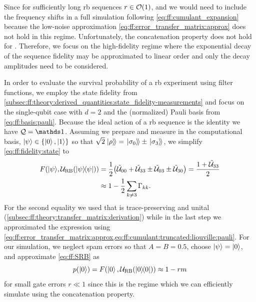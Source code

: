 Since for sufficiently long \gls{rb} sequences $r\in\order{1}$, and we would need to include the frequency shifts \freqshifts in a full simulation following \cref{eq:ff:cumulant_expansion} because the low-noise approximation \cref{eq:ff:error_transfer_matrix:approx} does not hold in this regime.
Unfortunately, the concatenation property does not hold for \freqshifts.
Therefore, we focus on the high-fidelity regime where the exponential decay of the sequence fidelity may be approximated to linear order and only the decay amplitudes \decayamps need to be considered.

In order to evaluate the survival probability of a \gls{rb} experiment using filter functions, we employ the state fidelity from \cref{subsec:ff:theory:derived_quantities:state_fidelity-measurements} and focus on the single-qubit case with $d = 2$ and the (normalized) Pauli basis from \cref{eq:ff:basis:pauli}.
Because the ideal action of a \gls{rb} sequence is the identity we have $\liouvQ = \eye$.
Assuming we prepare and measure in the computational basis, $\mbox{\ensuremath{\ket{\psi}}}\in\lbrace\ket{0}, \ket{1}\rbrace$ so that $\sqrt{2}\dket{\rho} = \dket{\sigma_0}\pm\dket{\sigma_3}$, we simplify \cref{eq:ff:fidelity:state} to
\begin{equation}\label{eq:ff:fidelity:state:RB}
\begin{split}
    F(\mbox{\ensuremath{\ket{\psi}}}, \mathcal{U}_{\mathrm{RB}}(\op{\psi})) &= \frac{1}{2}\bigl(\mathcal{\tilde{U}}_{00} +
    \mathcal{\tilde{U}}_{33}\pm
    \mathcal{\tilde{U}}_{03}\pm
    \mathcal{\tilde{U}}_{30}\bigr)
    = \frac{1 + \mathcal{\tilde{U}}_{33}}{2} \\
    &\approx 1 - \frac{1}{2}\sum_{k\neq 3}\Gamma_{kk}.
\end{split}
\end{equation}
For the second equality we used that \liouvUe is trace-preserving and unital (\cf \cref{subsec:ff:theory:transfer_matrix:derivation}) while in the last step we approximated the expression using \cref{eq:ff:error_transfer_matrix:approx,eq:ff:cumulant:truncated:liouville:pauli}.
For our simulation, we neglect \gls{spam} errors so that $A =  B =  0.5$, choose $\mbox{\ensuremath{\ket{\psi}}} = \ket{0}$, and approximate \cref{eq:ff:SRB} as
\begin{equation}\label{eq:ff:fidelity:state:RB:fit}
p(\ket{0}) = F(\ket{0}, \mathcal{U}_{\mathrm{RB}}(\op{0}))\approx 1 - rm
\end{equation}
for small gate errors $r\ll 1$ since this is the regime which we can efficiently simulate using the concatenation property.

